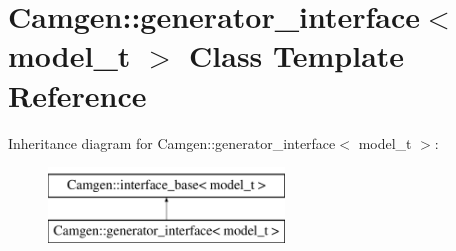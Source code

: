 \hypertarget{a00242}{}\section{Camgen\+:\+:generator\+\_\+interface$<$ model\+\_\+t $>$ Class Template Reference}
\label{a00242}
Inheritance diagram for Camgen\+:\+:generator\+\_\+interface$<$ model\+\_\+t $>$\+:\begin{figure}[H]
\begin{center}
\leavevmode
\includegraphics[height=2.000000cm]{a00242}
\end{center}
\end{figure}
